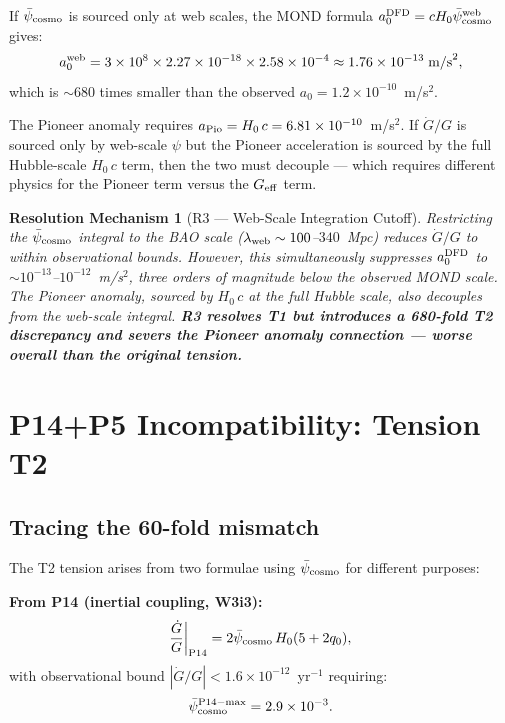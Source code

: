 \documentclass[aps,prd,twocolumn,superscriptaddress,nofootinbib,longbibliography]{revtex4-2}
\newcommand{\psibar}{\bar{\psi}}
\newcommand{\ee}[1]{\times 10^{#1}}
\newtheorem{resolution}{Resolution Mechanism}
\begin{document}
If $\psibar_{\rm cosmo}$ is sourced only at web scales, the MOND formula
$a_0^{\rm DFD} = cH_0\psibar_{\rm cosmo}^{\rm web}$ gives:
\begin{equation}
a_0^{\rm web} = 3\ee{8}\times 2.27\ee{-18}\times 2.58\ee{-4}
\approx 1.76\ee{-13}\;\text{m/s}^2,
\label{eq:a0-web}
\end{equation}
which is $\sim 680$ times smaller than the observed
$a_0 = 1.2\ee{-10}$~m/s$^2$.

The Pioneer anomaly requires $a_{\rm Pio} = H_0\,c = 6.81\ee{-10}$~m/s$^2$.
If $\dot{G}/G$ is sourced only by web-scale $\psi$ but the Pioneer acceleration
is sourced by the full Hubble-scale $H_0\,c$ term, then the two must decouple
--- which requires different physics for the Pioneer term versus the
$G_{\rm eff}$ term.

\begin{resolution}[R3 --- Web-Scale Integration Cutoff]
\label{res:R3}
Restricting the $\psibar_{\rm cosmo}$ integral to the BAO scale
($\lambda_{\rm web} \sim 100$--$340$~Mpc) reduces $\dot{G}/G$ to within
observational bounds.  However, this simultaneously suppresses $a_0^{\rm DFD}$
to $\sim 10^{-13}$--$10^{-12}$~m/s$^2$, three orders of magnitude below
the observed MOND scale.  The Pioneer anomaly, sourced by $H_0\,c$ at the
full Hubble scale, also decouples from the web-scale integral.
\textbf{R3 resolves T1 but introduces a 680-fold T2 discrepancy and severs
the Pioneer anomaly connection --- worse overall than the original tension.}
\end{resolution}

\section{P14+P5 Incompatibility: Tension T2}
\label{sec:T2}

\subsection{Tracing the 60-fold mismatch}

The T2 tension arises from two formulae using $\psibar_{\rm cosmo}$ for
different purposes:

\textbf{From P14 (inertial coupling, W3i3):}
\begin{equation}
\frac{\dot{G}}{G}\bigg|_{\rm P14} = 2\psibar_{\rm cosmo}\,H_0(5+2q_0),
\label{eq:Gdot-P14}
\end{equation}
with observational bound $|\dot{G}/G| < 1.6\ee{-12}$~yr$^{-1}$ requiring:
\begin{equation}
\psibar_{\rm cosmo}^{\rm P14-max} = 2.9\ee{-3}.
\label{eq:psibar-P14-max}
\end{equation}
\end{document}
